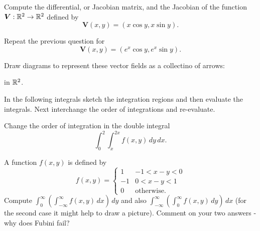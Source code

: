 
\question Compute the differential, 
or Jacobian matrix, 
and the Jacobian of the function 
$\bm V: \mathbb{R}^2 \to \mathbb{R}^2$
defined by
\[
    \bm V(x, y) = (x\cos y, x\sin y).
\]

\question Repeat the previous question for
\[
    \bm V(x, y) = (e^x\cos y, e^x\sin y).
\]

\question Draw diagrams to represent these vector fields as a collectino of arrows:
in $\mathbb{R}^2$.

\question In the following integrals sketch the integration regions
and then evaluate the integrals.
Next interchange the order of integrations and re-evaluate.

\question Change the order of integration in the double integral
\[
    \int_0^2 \int_x^{2x} f(x, y) \,dy \,dx.
\]

\question A function $f(x, y)$ is defined by
\[
    f(x, y)=
    \begin{cases}
        1  & -1 < x-y < 0 \\
        -1 & 0 < x-y < 1 \\
        0  & \text{otherwise}.
    \end{cases}
\]
Compute $\int_0^\infty\left(\int_{-\infty}^\infty f(x, y) \,dx\right)\,dy$
and also $\int_{-\infty}^\infty\left(\int_0^\infty f(x, y)\,dy\right)\,dx$
(for the second case it might help to draw a picture).
Comment on your two answers - why does Fubini fail?


